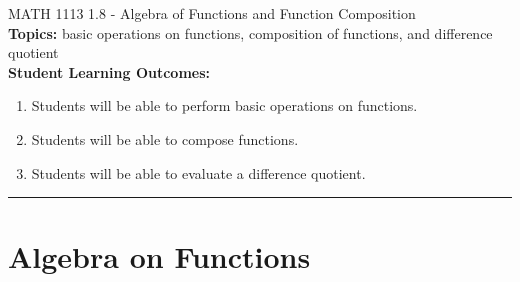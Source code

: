 \documentclass[11pt]{article}
\begin{document}
\noindent MATH 1113   \hfill 1.8 - Algebra of Functions and Function Composition\\



\noindent \textbf{Topics:}  basic operations on functions, composition of functions, and difference quotient\\

\noindent \textbf{Student Learning Outcomes:}
\begin{enumerate}
\item Students will be able to perform basic operations on functions.
\item Students will be able to compose functions.
\item Students will be able to evaluate a difference quotient.
\end{enumerate}

\hrule 
\vspace{5mm}
\section{Algebra on Functions}
\end{document}
